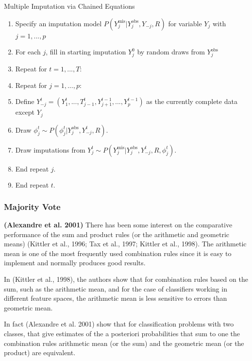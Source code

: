 \documentclass[12pt,]{article}
\begin{document}
\begin{algorithm}[H]

\caption{Multiple Imputation via Chained Equations}
\DontPrintSemicolon
\SetAlgoLined
\BlankLine

\begin{enumerate}
  \item Specify an imputation model $P(Y^{\text{mis}}_j \vert Y^{\text{obs}}_j, Y_{-j}, R)$ for variable $Y_j$ with $j=1,...,p$
  \item For each $j$, fill in starting imputation $Y^0_j$ by random draws from $Y^{\text{obs}}_j$
  \item Repeat for $t=1,...,T:$
  \item Repeat for $j=1,...,p:$
  \item Define $Y^t_{-j} = (Y^t_1,...,T^t_{j-1}, Y^{t-1}_{j+1},..., Y^{t-1}_p)$ as the currently complete data except $Y_j$ 
  \item Draw $\phi^t_j \sim P(\phi^t_j \vert Y^{\text{obs}}_j, Y^t_{-j}, R)$.
  \item Draw imputations from $Y^t_j \sim P(Y^{ \text{mis} }_j \vert Y^{ \text{obs} }_j, Y^t_{-j}, R, \phi^t_j)$.
  \item End repeat $j$.
  \item End repeat $t$.

\end{enumerate}
\BlankLine

\end{algorithm}

\subsubsection{Majority Vote}\label{majority-vote}

\textbf{(Alexandre et al. 2001)} There has been some interest on the
comparative performance of the sum and product rules (or the arithmetic
and geometric means) (Kittler et al., 1996; Tax et al., 1997; Kittler et
al., 1998). The arithmetic mean is one of the most frequently used
combination rules since it is easy to implement and normally produces
good results.

In (Kittler et al., 1998), the authors show that for combination rules
based on the sum, such as the arithmetic mean, and for the case of
classifiers working in different feature spaces, the arithmetic mean is
less sensitive to errors than geometric mean.

In fact (Alexandre et al. 2001) show that for classification problems
with two classes, that give estimates of the a posteriori probabilities
that sum to one the combination rules arithmetic mean (or the sum) and
the geometric mean (or the product) are equivalent.
\end{document}
